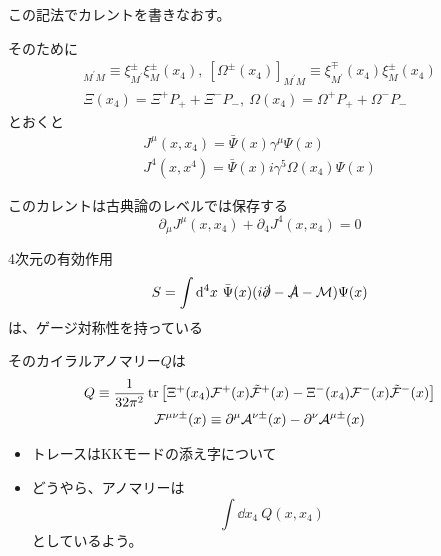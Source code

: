 \documentclass[
  unicode,a4paper,10pt,
  xcolor = {dvipsnames,svgnames},
  hyperref ={colorlinks=true,citecolor=Navy,linkcolor=NavyBlue,urlcolor=purple},
  ja=standard,lualatex
]{beamer}
\begin{document}
\begin{frame}

  この記法でカレントを書きなおす。

  そのために
  \begin{gather*}
    [\Xi^{\pm}(x_4)]_{M^{\prime}M}
    \equiv
    \xi^{\pm}_{M^{\prime}}\xi^{\pm}_{M}(x_{4})
    ,\ 
    [\Omega^{\pm}(x_{4})]_{M^{\prime}M}
    \equiv
    \xi_{M^{\prime}}^{\mp}(x_{4})\xi_{M}^{\pm}(x_{4})
    \\
    \Xi(x_{4})
    =
    \Xi^{+}P_{+}
    +
    \Xi^{-}P_{-}
    ,\ 
    \Omega(x_{4})
    =
    \Omega^{+}P_{+}
    +
    \Omega^{-}P_{-}
  \end{gather*}
  とおくと
  \begin{gather*}
    J^{\mu}(x,x_{4})
    =
    \bar{\Psi}(x)\gamma^{\mu}\Psi(x)
    \\
    J^{4}(x,x^{4})
    =
    \bar{\Psi}(x)i\gamma^{5}\Omega(x_{4})\Psi(x)
  \end{gather*}

  このカレントは古典論のレベルでは保存する
  \begin{equation*}
    \partial_{\mu}J^{\mu}(x,x_{4})
    +
    \partial_{4}J^{4}(x,x_{4})
    =
    0
  \end{equation*}

\end{frame}


\begin{frame}

  4次元の有効作用
  \begin{equation*}
    S
    =
    \int\dd^4 x\ 
    \bar{\Psi}(x)(i\slashed{\partial}-\slashed{\mathcal{A}}-\mathcal{M})\Psi(x)
  \end{equation*}
  は、ゲージ対称性を持っている

  \vspace*{5pt}

  そのカイラルアノマリー$Q$は
  \begin{gather*}
    Q
    \equiv
    \frac{1}{32\pi^2}
    \tr
    \left[  
      \Xi^{+}(x_{4})\mathcal{F}^{+}(x)\tilde{\mathcal{F}}^{+}(x)
      -
      \Xi^{-}(x_{4})\mathcal{F}^{-}(x)\tilde{\mathcal{F}}^{-}(x)
    \right]
    \\
    \mathcal{F}^{\mu\nu\pm}(x)
    \equiv
    \partial^{\mu}\mathcal{A}^{\nu\pm}(x)
    -
    \partial^{\nu}\mathcal{A}^{\mu\pm}(x)
  \end{gather*}

  \begin{itemize}
    \item 
    トレースはKKモードの添え字について
    \item 
    どうやら、アノマリーは
    \begin{equation*}
      \int\dd x_{4}\ Q(x,x_{4})
    \end{equation*}
    としているよう。
  \end{itemize}

\end{frame}
\end{document}
